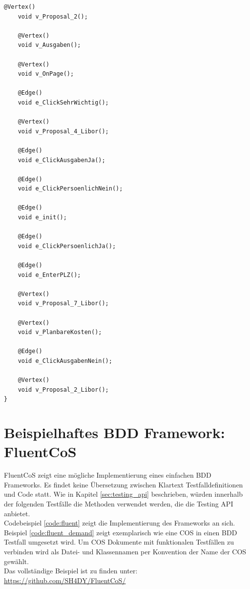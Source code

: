 \begin{lstlisting}[caption=ModellLogisch.java, label=code:gw_generated]
    @Vertex()
    void v_Proposal_2();

    @Vertex()
    void v_Ausgaben();

    @Vertex()
    void v_OnPage();

    @Edge()
    void e_ClickSehrWichtig();

    @Vertex()
    void v_Proposal_4_Libor();

    @Edge()
    void e_ClickAusgabenJa();

    @Edge()
    void e_ClickPersoenlichNein();

    @Edge()
    void e_init();

    @Edge()
    void e_ClickPersoenlichJa();

    @Edge()
    void e_EnterPLZ();

    @Vertex()
    void v_Proposal_7_Libor();

    @Vertex()
    void v_PlanbareKosten();

    @Edge()
    void e_ClickAusgabenNein();

    @Vertex()
    void v_Proposal_2_Libor();
}
\end{lstlisting}

\section{Beispielhaftes BDD Framework: FluentCoS}
\label{app:fluent}
FluentCoS zeigt eine mögliche Implementierung eines einfachen BDD Frameworks. Es findet keine Übersetzung zwischen Klartext Testfalldefinitionen und Code statt. Wie in Kapitel \ref{sec:testing_api} beschrieben, würden innerhalb der folgenden Testfälle die Methoden verwendet werden, die die Testing API anbietet.\\

Codebeispiel \ref{code:fluent} zeigt die Implementierung des Frameworks an sich. Beispiel \ref{code:fluent_demand} zeigt exemplarisch wie eine \Gls{COS} in einen BDD Testfall umgesetzt wird. Um \Gls{COS} Dokumente mit funktionalen Testfällen zu verbinden wird als Datei- und Klassennamen per Konvention der Name der \Gls{COS} gewählt.\\

Das vollständige Beispiel ist zu finden unter: \url{https://github.com/SH4DY/FluentCoS/}

